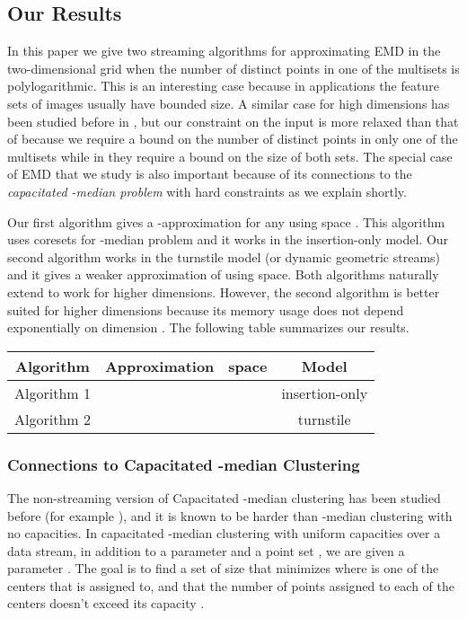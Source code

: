 \documentclass[oribibl]{llncs}
\begin{document}
\subsection{Our Results}
In this paper we give two streaming algorithms for approximating
EMD in the two-dimensional grid  when the number of distinct points
in one of the multisets is polylogarithmic. This is an interesting case because
in applications the feature sets of images usually have bounded size.
A similar case for high dimensions has been studied before in \cite{kraught08},
but our constraint on the input is more relaxed than that of \cite{kraught08}
because we require a bound on the number of distinct
points in only one of the multisets while in \cite{kraught08}
they require a bound on the size of both sets.
The special case of EMD that we study
is also important because of its connections to the \textit{capacitated
-median problem} with hard constraints as we explain shortly.

Our first algorithm gives a -approximation for any 
using space . This algorithm uses coresets
for -median problem and it works in the insertion-only model.
Our second algorithm works in the turnstile model (or dynamic geometric streams)
and it gives a weaker approximation of  using
 space.
Both algorithms naturally extend to work for higher
dimensions. However, the second algorithm is better suited for higher dimensions
because its memory usage does not depend exponentially on dimension . 
The following table summarizes our results.

\begin{table}
\begin{center}
\begin{tabular}{|c|c|c|c|}
\hline
Algorithm & Approximation & space & Model  \\
\hline
Algorithm 1 &  & & insertion-only\\
Algorithm 2 &  & & turnstile\\
\hline
\end{tabular}
\end{center}
\end{table}

\subsubsection{Connections to Capacitated -median Clustering}
The non-streaming version of Capacitated -median clustering
has been studied before (for example \cite{cap_kmedian1, cap_facil}),
and it is known to be harder than -median clustering with no capacities.
In capacitated -median clustering with uniform capacities over
a data stream, in addition to a parameter  and a point set
, we are given a parameter .
The goal is to find a set  of size  that minimizes
 where  is one of the  centers
that  is assigned to, and that the number of points
assigned to each of the  centers doesn't exceed its capacity .
\end{document}
